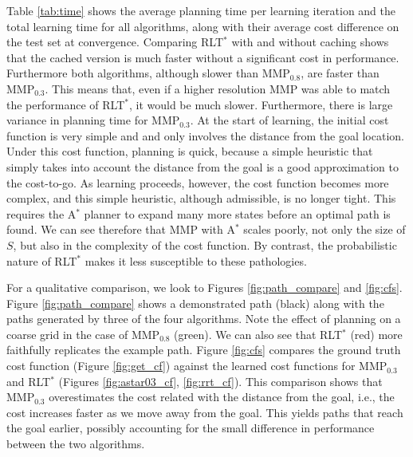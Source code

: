 \documentclass[a4paper,11pt]{report}
\begin{document}
	Table \ref{tab:time} shows the average planning time per learning iteration and the total learning time for all algorithms, along with their average cost difference on the test set at convergence. Comparing RLT$^*$ with and without caching shows that the cached version is much faster without a significant cost in performance. Furthermore both algorithms, although slower than MMP$_{0.8}$, are faster than MMP$_{0.3}$. This means that, even if a higher resolution MMP  was able to match the performance of RLT$^*$, it would be much slower. Furthermore, there is large variance in planning time for MMP$_{0.3}$. At the start of learning, the initial cost function is very simple and and only involves the distance from the goal location. Under this cost function, planning is quick, because a simple heuristic that simply takes into account the distance from the goal is a  good approximation to the cost-to-go. As learning proceeds, however, the cost function becomes more complex, and this simple heuristic, although admissible, is no longer tight. This requires the A$^*$ planner to expand many more states before an optimal path is found. We can see therefore that MMP with A$^*$ scales poorly, not only the size of $S$, but also in the complexity of the cost function. By contrast, the probabilistic nature of RLT$^*$ makes it less susceptible to these pathologies.  

	For a qualitative comparison, we look to Figures \ref{fig:path_compare} and \ref{fig:cfs}. Figure \ref{fig:path_compare} shows a demonstrated path (black) along with the paths generated by three of the four algorithms. Note the effect of planning on a coarse grid in the case of MMP$_{0.8}$ (green). We can also see that RLT$^*$ (red) more faithfully replicates the example path. Figure \ref{fig:cfs} compares the ground truth cost function (Figure \ref{fig:get_cf}) against the learned cost functions for  MMP$_{0.3}$ and RLT$^*$ (Figures \ref{fig:astar03_cf}, \ref{fig:rrt_cf}). This comparison shows that  MMP$_{0.3}$ overestimates the cost related with the distance from the goal, i.e., the cost increases faster as we move away from the goal. This yields paths that reach the goal earlier, possibly accounting for the small difference in performance between the two algorithms. 
\end{document}
